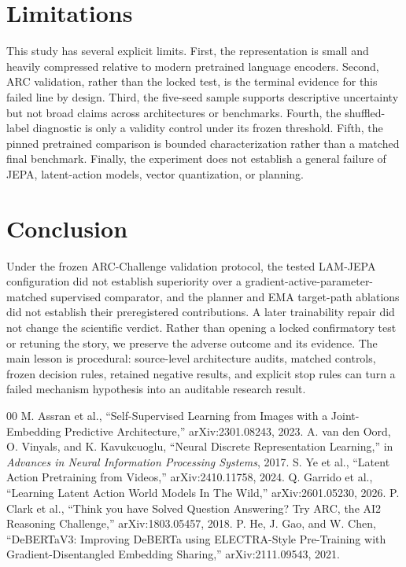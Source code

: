 \documentclass[conference]{IEEEtran}
\begin{document}
\section{Limitations}
This study has several explicit limits. First, the representation is small and heavily compressed relative to modern pretrained language encoders. Second, ARC validation, rather than the locked test, is the terminal evidence for this failed line by design. Third, the five-seed sample supports descriptive uncertainty but not broad claims across architectures or benchmarks. Fourth, the shuffled-label diagnostic is only a validity control under its frozen threshold. Fifth, the pinned pretrained comparison is bounded characterization rather than a matched final benchmark. Finally, the experiment does not establish a general failure of JEPA, latent-action models, vector quantization, or planning.

\section{Conclusion}
Under the frozen ARC-Challenge validation protocol, the tested LAM-JEPA configuration did not establish superiority over a gradient-active-parameter-matched supervised comparator, and the planner and EMA target-path ablations did not establish their preregistered contributions. A later trainability repair did not change the scientific verdict. Rather than opening a locked confirmatory test or retuning the story, we preserve the adverse outcome and its evidence. The main lesson is procedural: source-level architecture audits, matched controls, frozen decision rules, retained negative results, and explicit stop rules can turn a failed mechanism hypothesis into an auditable research result.

\begin{thebibliography}{00}
 M. Assran et al., ``Self-Supervised Learning from Images with a Joint-Embedding Predictive Architecture,'' arXiv:2301.08243, 2023.
 A. van den Oord, O. Vinyals, and K. Kavukcuoglu, ``Neural Discrete Representation Learning,'' in \emph{Advances in Neural Information Processing Systems}, 2017.
 S. Ye et al., ``Latent Action Pretraining from Videos,'' arXiv:2410.11758, 2024.
 Q. Garrido et al., ``Learning Latent Action World Models In The Wild,'' arXiv:2601.05230, 2026.
 P. Clark et al., ``Think you have Solved Question Answering? Try ARC, the AI2 Reasoning Challenge,'' arXiv:1803.05457, 2018.
 P. He, J. Gao, and W. Chen, ``DeBERTaV3: Improving DeBERTa using ELECTRA-Style Pre-Training with Gradient-Disentangled Embedding Sharing,'' arXiv:2111.09543, 2021.
\end{thebibliography}
\end{document}
